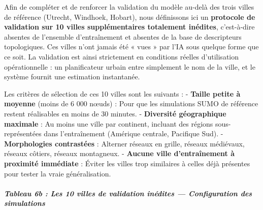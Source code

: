 \documentclass[10pt, a4paper]{article}
\begin{document}
Afin de compléter et de renforcer la validation du modèle au-delà des
trois villes de référence (Utrecht, Windhoek, Hobart), nous définissons
ici un \textbf{protocole de validation sur 10 villes supplémentaires
totalement inédites}, c'est-à-dire absentes de l'ensemble d'entraînement
et absentes de la base de descripteurs topologiques. Ces villes n'ont
jamais été « vues » par l'IA sous quelque forme que ce soit. La
validation est ainsi strictement en conditions réelles d'utilisation
opérationnelle : un planificateur urbain entre simplement le nom de la
ville, et le système fournit une estimation instantanée.

Les critères de sélection de ces 10 villes sont les suivants : -
\textbf{Taille petite à moyenne} (moins de 6 000 nœuds) : Pour que les
simulations SUMO de référence restent réalisables en moins de 30
minutes. - \textbf{Diversité géographique maximale} : Au moins une ville
par continent, incluant des régions sous-représentées dans
l'entraînement (Amérique centrale, Pacifique Sud). -
\textbf{Morphologies contrastées} : Alterner réseaux en grille, réseaux
médiévaux, réseaux côtiers, réseaux montagneux. - \textbf{Aucune ville
d'entraînement à proximité immédiate} : Éviter les villes trop
similaires à celles déjà présentes pour tester la vraie généralisation.

\subparagraph{Tableau 6b : Les 10 villes de validation inédites ---
Configuration des
simulations}\label{tableau-6b-les-10-villes-de-validation-inuxe9dites-configuration-des-simulations}
\end{document}

